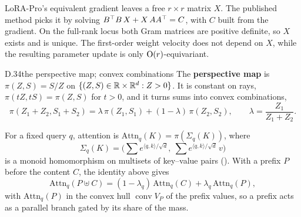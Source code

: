 LoRA-Pro's equivalent gradient leaves a free $r\times r$ matrix $X$. The published method picks it by solving $B^{\top}
B\,X+X\,AA^{\top}=C$, with $C$ built from the gradient. On the full-rank locus both Gram matrices are positive definite, so
$X$ exists and is unique. The first-order weight velocity does not depend on $X$, while the resulting parameter update
is only $\mathrm{O}(r)$-equivariant.


\begin{bgentry}{D.34}{the perspective map; convex combinations}
The \textbf{perspective map} is $\pi(Z,S)=S/Z$ on $\{(Z,S)\in\mathbb{R}\times\mathbb{R}^d:Z>0\}$. It is constant on rays,
$\pi(tZ,tS)=\pi(Z,S)$ for $t>0$, and it turns sums into convex combinations,
\[\pi(Z_1+Z_2,S_1+S_2)=\lambda\,\pi(Z_1,S_1)+(1-\lambda)\,\pi(Z_2,S_2),\qquad\lambda=\frac{Z_1}{Z_1+Z_2}.\]
\end{bgentry}

For a fixed query $q$, attention is $\mathrm{Attn}_q(K)=\pi(\Sigma_q(K))$, where
\[\Sigma_q(K)=\Big(\sum e^{\langle q,k\rangle/\sqrt d},\ \sum e^{\langle q,k\rangle/\sqrt d}\,v\Big)\]
is a monoid homomorphism on multisets of key--value pairs (). With a prefix $P$ before the content $C$, the
identity above gives
\[\mathrm{Attn}_q(P\uplus C)=(1-\lambda_q)\,\mathrm{Attn}_q(C)+\lambda_q\,\mathrm{Attn}_q(P),\]
with $\mathrm{Attn}_q(P)$ in the convex hull $\operatorname{conv}V_P$ of the prefix values, so a prefix acts as a
parallel branch gated by its share of the mass.


